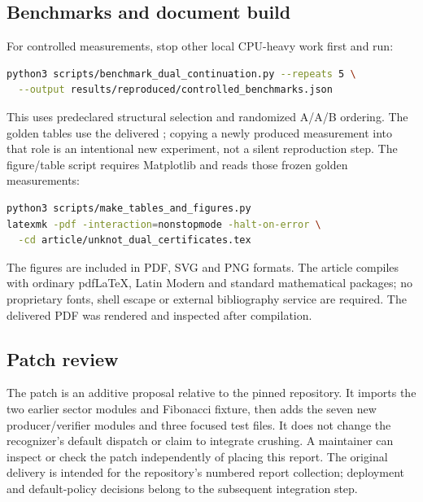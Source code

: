 \subsection{Benchmarks and document build}

For controlled measurements, stop other local CPU-heavy work first and run:
\begin{lstlisting}[language=bash]
python3 scripts/benchmark_dual_continuation.py --repeats 5 \
  --output results/reproduced/controlled_benchmarks.json
\end{lstlisting}
This uses predeclared structural selection and randomized A/A/B ordering. The golden tables use the delivered ; copying a newly produced measurement into that role is an intentional new experiment, not a silent reproduction step. The figure/table script requires Matplotlib and reads those frozen golden measurements:
\begin{lstlisting}[language=bash]
python3 scripts/make_tables_and_figures.py
latexmk -pdf -interaction=nonstopmode -halt-on-error \
  -cd article/unknot_dual_certificates.tex
\end{lstlisting}
The figures are included in PDF, SVG and PNG formats. The article compiles with ordinary pdf\LaTeX{}, Latin Modern and standard mathematical packages; no proprietary fonts, shell escape or external bibliography service are required. The delivered PDF was rendered and inspected after compilation.

\subsection{Patch review}

The patch is an additive proposal relative to the pinned repository. It imports the two earlier sector modules and Fibonacci fixture, then adds the seven new producer/verifier modules and three focused test files. It does not change the recognizer's default dispatch or claim to integrate crushing. A maintainer can inspect or check the patch independently of placing this report. The original delivery is intended for the repository's numbered report collection; deployment and default-policy decisions belong to the subsequent integration step.
